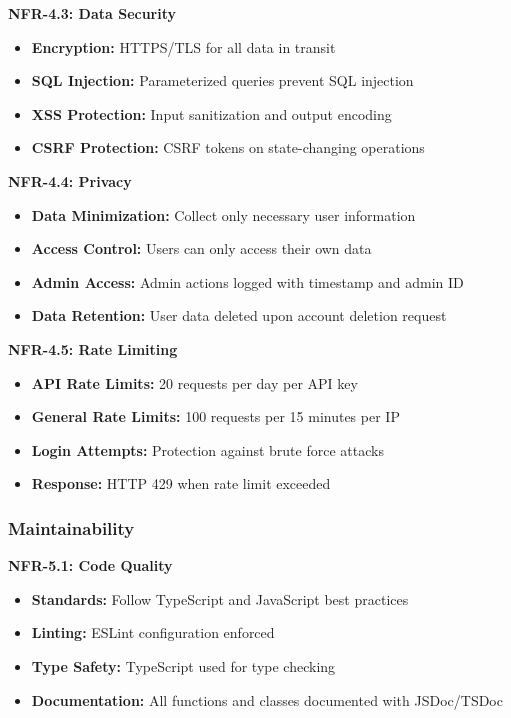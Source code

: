 \documentclass[12pt,a4paper]{article}
\begin{document}
\textbf{NFR-4.3: Data Security}
\begin{itemize}
    \item \textbf{Encryption:} HTTPS/TLS for all data in transit
    \item \textbf{SQL Injection:} Parameterized queries prevent SQL injection
    \item \textbf{XSS Protection:} Input sanitization and output encoding
    \item \textbf{CSRF Protection:} CSRF tokens on state-changing operations
\end{itemize}

\textbf{NFR-4.4: Privacy}
\begin{itemize}
    \item \textbf{Data Minimization:} Collect only necessary user information
    \item \textbf{Access Control:} Users can only access their own data
    \item \textbf{Admin Access:} Admin actions logged with timestamp and admin ID
    \item \textbf{Data Retention:} User data deleted upon account deletion request
\end{itemize}

\textbf{NFR-4.5: Rate Limiting}
\begin{itemize}
    \item \textbf{API Rate Limits:} 20 requests per day per API key
    \item \textbf{General Rate Limits:} 100 requests per 15 minutes per IP
    \item \textbf{Login Attempts:} Protection against brute force attacks
    \item \textbf{Response:} HTTP 429 when rate limit exceeded
\end{itemize}

\subsubsection{Maintainability}

\textbf{NFR-5.1: Code Quality}
\begin{itemize}
    \item \textbf{Standards:} Follow TypeScript and JavaScript best practices
    \item \textbf{Linting:} ESLint configuration enforced
    \item \textbf{Type Safety:} TypeScript used for type checking
    \item \textbf{Documentation:} All functions and classes documented with JSDoc/TSDoc
\end{itemize}
\end{document}
